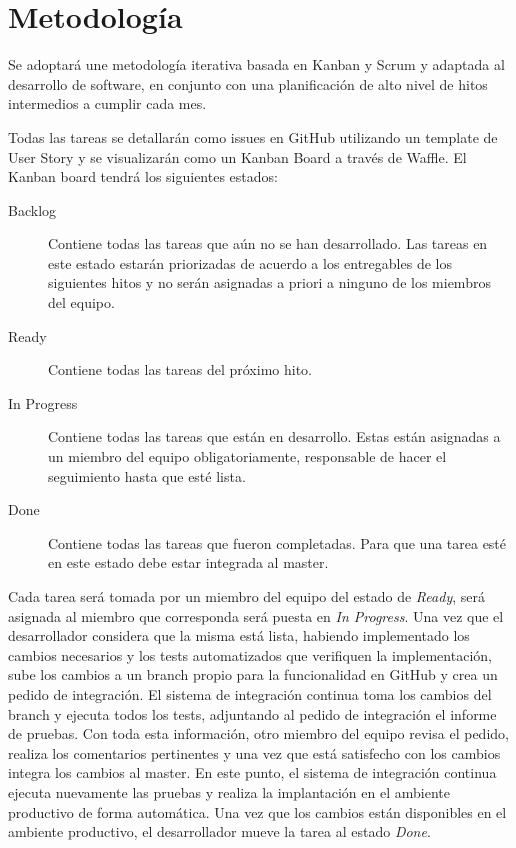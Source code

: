\documentclass[a4paper,11pt]{article}
\begin{document}
\section{Metodología}

Se adoptará une metodología iterativa basada en Kanban \cite{kanban} y Scrum
\cite{scrum} y adaptada al desarrollo de software, en conjunto con una
planificación de alto nivel de hitos intermedios a cumplir cada mes.

Todas las tareas se detallarán como issues en GitHub utilizando un template de
User Story \cite{userstory} y se visualizarán como un Kanban Board
\cite{kanbanboard} a través de Waffle. El Kanban board tendrá los siguientes
estados:

\begin{description}

  \item[Backlog] Contiene todas las tareas que aún no se han desarrollado. Las
    tareas en este estado estarán priorizadas de acuerdo a los entregables de
    los siguientes hitos y no serán asignadas a priori a ninguno de los
    miembros del equipo.

  \item[Ready] Contiene todas las tareas del próximo hito.

  \item[In Progress] Contiene todas las tareas que están en desarrollo. Estas
    están asignadas a un miembro del equipo obligatoriamente, responsable de
    hacer el seguimiento hasta que esté lista.

  \item[Done] Contiene todas las tareas que fueron completadas. Para que una
    tarea esté en este estado debe estar integrada al master.

\end{description}

Cada tarea será tomada por un miembro del equipo del estado de \textit{Ready},
será asignada al miembro que corresponda será puesta en \textit{In Progress}.
Una vez que el desarrollador considera que la misma está lista, habiendo
implementado los cambios necesarios y los tests automatizados que verifiquen la
implementación, sube los cambios a un branch propio para la funcionalidad en
GitHub y crea un pedido de integración. El sistema de integración continua toma
los cambios del branch y ejecuta todos los tests, adjuntando al pedido de
integración el informe de pruebas. Con toda esta información, otro miembro del
equipo revisa el pedido, realiza los comentarios pertinentes y una vez que está
satisfecho con los cambios integra los cambios al master. En este punto, el
sistema de integración continua ejecuta nuevamente las pruebas y realiza la
implantación en el ambiente productivo de forma automática. Una vez que los
cambios están disponibles en el ambiente productivo, el desarrollador
mueve la tarea al estado \textit{Done}.
\end{document}
